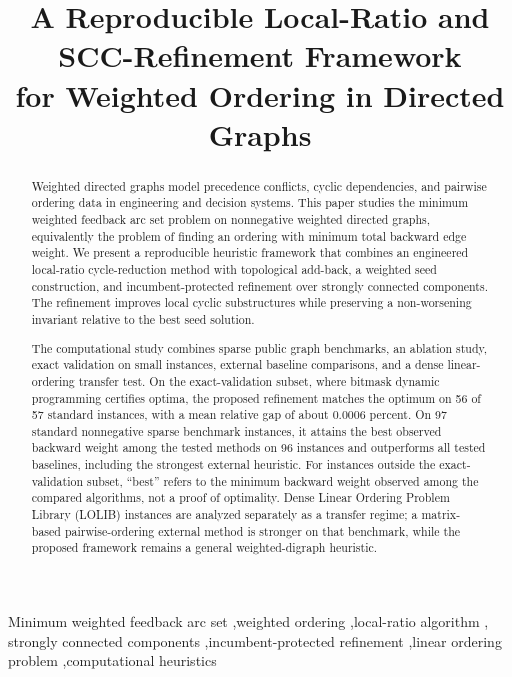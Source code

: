 \documentclass[preprint,12pt,authoryear]{elsarticle}
\begin{document}
\begin{frontmatter}

\title{A Reproducible Local-Ratio and SCC-Refinement Framework\\ for Weighted Ordering in Directed Graphs}

\begin{abstract}
Weighted directed graphs model precedence conflicts, cyclic dependencies, and pairwise ordering data in engineering and decision systems. This paper studies the minimum weighted feedback arc set problem on nonnegative weighted directed graphs, equivalently the problem of finding an ordering with minimum total backward edge weight. We present a reproducible heuristic framework that combines an engineered local-ratio cycle-reduction method with topological add-back, a weighted seed construction, and incumbent-protected refinement over strongly connected components. The refinement improves local cyclic substructures while preserving a non-worsening invariant relative to the best seed solution.

The computational study combines sparse public graph benchmarks, an ablation study, exact validation on small instances, external baseline comparisons, and a dense linear-ordering transfer test. On the exact-validation subset, where bitmask dynamic programming certifies optima, the proposed refinement matches the optimum on 56 of 57 standard instances, with a mean relative gap of about 0.0006 percent. On 97 standard nonnegative sparse benchmark instances, it attains the best observed backward weight among the tested methods on 96 instances and outperforms all tested baselines, including the strongest external heuristic. For instances outside the exact-validation subset, ``best'' refers to the minimum backward weight observed among the compared algorithms, not a proof of optimality. Dense Linear Ordering Problem Library (LOLIB) instances are analyzed separately as a transfer regime; a matrix-based pairwise-ordering external method is stronger on that benchmark, while the proposed framework remains a general weighted-digraph heuristic.
\end{abstract}

\begin{keyword}
Minimum weighted feedback arc set \sep weighted ordering \sep local-ratio algorithm \sep
strongly connected components \sep incumbent-protected refinement \sep linear ordering problem \sep computational heuristics
\end{keyword}

\end{frontmatter}










\FloatBarrier








\end{document}
